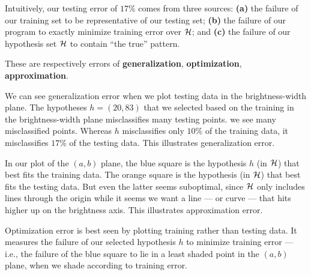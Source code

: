 
  Intuitively, our testing error of $17\%$ comes from three sources:
  \textbf{(a)} the failure of our training set to be representative of our testing set;
  \textbf{(b)} the failure of our program to exactly minimize training error over $\mathcal{H}$; and
  \textbf{(c)} the failure of our hypothesis set $\mathcal{H}$ to contain ``the true'' pattern.

  These are respectively errors of
  \textbf{generalization},
  \textbf{optimization},
  \textbf{approximation}.

  We can see generalization error when we plot testing data in the
  brightness-width plane.  The hypotheses $h=(20, 83)$ that we selected based
  on the training in the brightness-width plane misclassifies many testing
  points.  we see many misclassified points.  Whereas $h$ misclassifies only
  $10\%$ of the training data, it misclassifies $17\%$ of the testing data.
  This illustrates generalization error.

  In our plot of the $(a,b)$ plane,
  the {\blu blue square} is the hypothesis $h$ (in $\mathcal{H}$) that best fits
  the training data.  The {\rng orange square} is the hypothesis (in
  $\mathcal{H}$) that best fits the testing data.  But even the latter seems
  suboptimal, since $\mathcal{H}$ only includes lines through the origin while it
  seems we want a line --- or curve --- that hits higher up on the
  brightness axis.  This illustrates approximation error.

  Optimization error is best seen by plotting training rather than testing
  data.  It measures the failure of our selected hypothesis $h$ to minimize
  training error --- i.e., the failure of the {\blu blue square} to lie in a
  least shaded point in the $(a,b)$ plane, when we shade according to training
  error.

